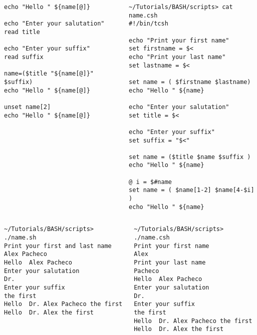 \documentclass[slidestop,mathserif,compress,xcolor=svgnames]{beamer}
\newenvironment{bblock}[0]
{
\begin{beamerboxesrounded}[upper=uppercol1,lower=lowercol1,shadow=true]}
{\end{beamerboxesrounded}}
\newenvironment{eblock}[0]
{
\begin{beamerboxesrounded}[upper=uppercol2,lower=lowercol2,shadow=true]}
{\end{beamerboxesrounded}}
\begin{document}
\begin{frame}
{\begin{columns}
\begin{eblock}{}
\begin{verbatim}
echo "Hello " ${name[@]}

echo "Enter your salutation"
read title

echo "Enter your suffix"
read suffix

name=($title "${name[@]}" $suffix)
echo "Hello " ${name[@]}

unset name[2]
echo "Hello " ${name[@]}
        \end{verbatim}
      \end{eblock}
      \vspace{-0.5cm}
      \begin{bblock}{}
        \begin{verbatim}
~/Tutorials/BASH/scripts> cat name.csh
#!/bin/tcsh

echo "Print your first name"
set firstname = $<
echo "Print your last name"
set lastname = $<

set name = ( $firstname $lastname)
echo "Hello " ${name}

echo "Enter your salutation"
set title = $<

echo "Enter your suffix"
set suffix = "$<"

set name = ($title $name $suffix )
echo "Hello " ${name}

@ i = $#name
set name = ( $name[1-2] $name[4-$i] )
echo "Hello " ${name}
        \end{verbatim}
      \end{bblock}
    \end{columns}
    \begin{columns}
      \begin{eblock}{}
        \begin{verbatim}
~/Tutorials/BASH/scripts> ./name.sh 
Print your first and last name
Alex Pacheco
Hello  Alex Pacheco
Enter your salutation
Dr.
Enter your suffix
the first
Hello  Dr. Alex Pacheco the first
Hello  Dr. Alex the first
        \end{verbatim}
      \end{eblock}
      \begin{bblock}{}
        \begin{verbatim}
~/Tutorials/BASH/scripts> ./name.csh 
Print your first name
Alex
Print your last name
Pacheco
Hello  Alex Pacheco
Enter your salutation
Dr.
Enter your suffix
the first
Hello  Dr. Alex Pacheco the first
Hello  Dr. Alex the first
        \end{verbatim}
      \end{bblock}
    \end{columns}
  }
\end{frame}
\end{document}
